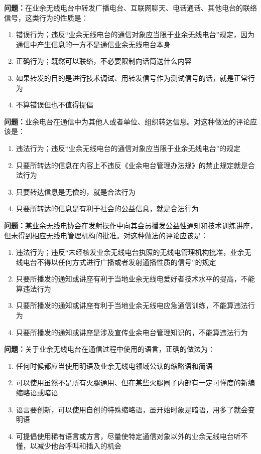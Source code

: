 \bigskip


\noindent\textbf{问题：}在业余无线电台中转发广播电台、互联网聊天、电话通话、其他电台的联络信号，这类行为的性质是：
\begin{enumerate}[label=\Alph*), leftmargin=3em]
\item 错误行为；违反“业余无线电台的通信对象应当限于业余无线电台”规定，因为通信中产生信息的一方不是通信业余无线电台本身
\item 正确行为；既然可以联络，不必要限制向话筒送什么内容
\item 如果转发的目的是进行技术调试、用转发信号作为测试信号的话，就是正常行为
\item 不算错误但也不值得提倡
\end{enumerate}

\bigskip


\noindent\textbf{问题：}业余电台在通信中为其他人或者单位、组织转达信息。对这种做法的评论应该是：
\begin{enumerate}[label=\Alph*), leftmargin=3em]
\item 违法行为；违反“业余无线电台的通信对象应当限于业余无线电台”的规定
\item 只要所转达的信息在内容上不违反《业余电台管理办法规》的禁止规定就是合法行为
\item 只要转达信息是无偿的，就是合法行为
\item 只要所转达的信息是有利于社会的公益信息，就是合法行为
\end{enumerate}

\bigskip


\noindent\textbf{问题：}某业余无线电协会在发射操作中向其会员播发公益性通知和技术训练讲座，但未得到相应无线电管理机构的批准。对这种做法的评论应该是：
\begin{enumerate}[label=\Alph*), leftmargin=3em]
\item 违法行为；违反“未经核发业余无线电台执照的无线电管理机构批准，业余无线电台不得以任何方式进行广播或者发射通播性质的信号”的规定
\item 只要所播发的通知或讲座有利于当地业余无线电爱好者技术水平的提高，不能算违法行为
\item 只要所播发的通知或讲座有利于当地业余无线电应急通信训练，不能算违法行为
\item 只要所播发的通知或讲座是涉及宣传业余电台管理知识的，不能算违法行为
\end{enumerate}

\bigskip


\noindent\textbf{问题：}关于业余无线电台在通信过程中使用的语言，正确的做法为：
\begin{enumerate}[label=\Alph*), leftmargin=3em]
\item 任何时候都应当使用明语及业余无线电领域公认的缩略语和简语
\item 可以使用虽然不是所有火腿通用、但在某些火腿圈子内部有一定可懂度的新编缩略语或暗语
\item 语言要创新，可以使用自创的特殊缩略语，虽开始时象是暗语，用多了就会变明语
\item 可提倡使用稀有语言或方言，尽量使特定通信对象以外的业余无线电台听不懂，以减少他台呼叫和插入的机会
\end{enumerate}

